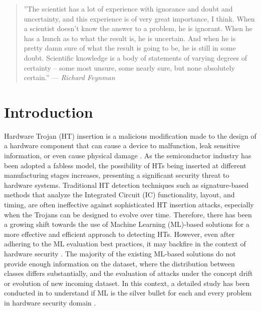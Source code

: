 \begingroup
\RaggedRight

\begin{quote}''The scientist has a lot of experience with ignorance and doubt and uncertainty, and this experience is of very great importance, I think. When a scientist doesn't know the answer to a problem, he is ignorant. When he has a hunch as to what the result is, he is uncertain. And when he is pretty damn sure of what the result is going to be, he is still in some doubt. Scientific knowledge is a body of statements of varying degrees of certainty -- some most unsure, some nearly sure, but none absolutely certain.''
\newline
\hfill — \textit{Richard Feynman}
\end{quote}

\section*{Introduction}
\label{Intro}
Hardware Trojan (HT) insertion is a malicious modification made to the design of a hardware component that can cause a device to malfunction, leak sensitive information, or even cause physical damage \cite{francq2015introduction}. As the semiconductor industry has been adopted a fabless model, the possibility of HTs being inserted at different manufacturing stages increases, presenting a significant security threat to hardware systems. Traditional HT detection techniques such as signature-based methods \cite{gbade2014signature} that analyze the Integrated Circuit (IC) functionality, layout, and timing, are often ineffective against sophisticated HT insertion attacks, especially when the Trojans can be designed to evolve over time. Therefore, there has been a growing shift towards the use of Machine Learning (ML)-based solutions for a more effective and efficient approach to detecting HTs. However, even after adhering to the ML evaluation best practices, it may backfire in the context of hardware security \cite{285613}. The majority of the existing ML-based solutions do not provide enough information on the dataset, where the distribution between classes differs substantially, and the evaluation of attacks under the concept drift or evolution of new incoming dataset. In this context, a detailed study has been conducted in \cite{quiring2022and} to understand if ML is the silver bullet for each and every problem in hardware security domain \cite{liu2021two}.


